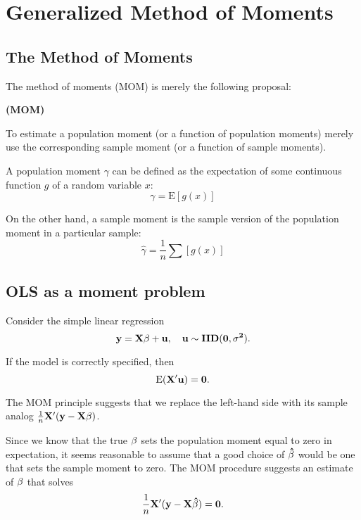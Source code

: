 \chapter{Generalized Method of Moments}


\section{The Method of Moments}

The method of moments (MOM) is merely the following proposal:

\begin{prop}{\bf{(MOM)}}

To estimate a population moment (or a function of population
moments) merely use the corresponding sample moment (or a function
of sample moments).
\end{prop}

A population moment $\gamma$ can be defined as the expectation of
some continuous function $g$ of a random variable $x$:
\begin{equation}
\gamma={\mathrm{E}} [g(x)]
\end{equation}

On the other hand, a sample moment is the sample version of the
population moment in a particular sample:
\begin{equation}
\hat \gamma=\frac{1}{n} \sum [g(x)]
\end{equation}

\section{OLS as a moment problem}

Consider the simple linear regression
\begin{equation}
\bf y=X\beta+u, \quad u \sim IID(0, \sigma^2).
\end{equation}

If the model is correctly specified, then
\begin{equation}
\rm E (\bf X'u)=0.
\end{equation}

The MOM principle suggests that we replace the left-hand side with
its sample analog $\frac{1}{n} \bf X'(y-X\beta)$.

Since we know that the true $\bf \beta$ sets the population moment
equal to zero in expectation, it seems reasonable to assume that a
good choice of $\bf \hat \beta$ would be one that sets the sample
moment to zero.  The MOM procedure suggests an estimate of $\bf
\beta$ that solves
\begin{equation}
\frac{1}{n} \bf X'(y-X \hat \beta)=0.
\end{equation}

